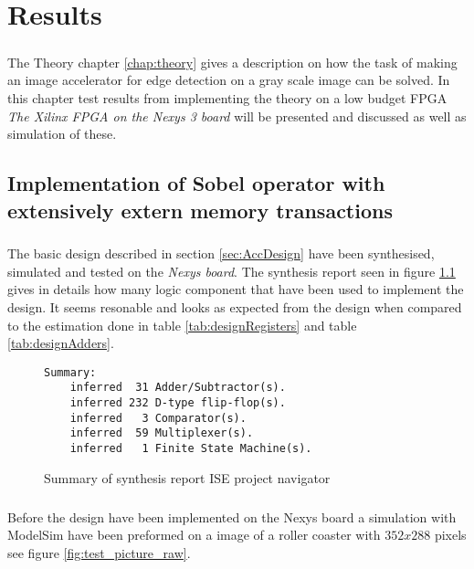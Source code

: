 \chapter{Results}
\label{chap:Results}
\paragraph*{}
The Theory chapter \ref{chap:theory} gives a description on how the task of making an image accelerator for edge detection on a gray scale image can be solved. In this chapter test results from implementing the theory on a low budget FPGA \textit{The Xilinx FPGA on the Nexys 3 board} will be presented and discussed as well as simulation of these.  

\section{Implementation of Sobel operator with extensively extern memory transactions}
\paragraph*{}
The basic design described in section \ref{sec:AccDesign} have been synthesised, simulated and tested on the \textit{Nexys board}. The synthesis report seen in figure \ref{fig:sum_synthesis_report} gives in details how many logic component that have been used to implement the design. It seems resonable and looks as expected from the design when compared to the estimation done in table \ref{tab:designRegisters} and table \ref{tab:designAdders}.  

\begin{figure}[H]
\centering
\begin{BVerbatim}
Summary:
    inferred  31 Adder/Subtractor(s).
    inferred 232 D-type flip-flop(s).
    inferred   3 Comparator(s).
    inferred  59 Multiplexer(s).
    inferred   1 Finite State Machine(s).
\end{BVerbatim}
\caption{Summary of synthesis report ISE project navigator}
\label{fig:sum_synthesis_report}
\end{figure}

\paragraph*{}
Before the design have been implemented on the Nexys board a simulation with ModelSim have been preformed on a image of a roller coaster with $352x288$ pixels see figure \ref{fig:test_picture_raw}. 

